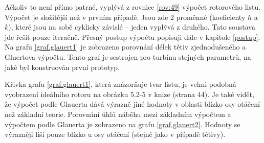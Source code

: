		Ačkoliv to není přímo patrné, vyplývá z rovnice \eqref{rov:49} výpočet rotorového listu. Výpočet je složitější než v prvním případě. Jsou zde 2 proměnné (koeficienty $h$ a $k$), které jsou na sobě cyklicky závislé – jeden vyplývá z druhého. Tato soustava jde řešit pouze iteračně. Přesný postup výpočtu popisuji dále v kapitole \ref{postup}. Na grafu \ref{graf.glauert1} je zobrazeno porovnání délek tětiv zjednodušeného a Gluertova výpočtu. Tento graf je sestrojen pro turbínu stejných parametrů, na jaké byl konstruován první prototyp.
		
		Křivka grafu \ref{graf.glauert1}, která znázorňuje tvar listu, je velmi podobná vyobrazení ideálního rotoru na obrázku 5.2-5 v knize \cite{Crome:Technika} (strana 44). Je také vidět, že výpočet podle Glauerta dává výrazně jiné hodnoty v oblasti blízko osy otáčení než základní teorie.
		Porovnání úhlů náběhu mezi základním výpočtem a výpočtem podle Glauerta je zobrazeno na grafu \ref{graf.glauert2}. Hodnoty se výrazněji liší pouze blízko u osy otáčení (stejně jako v případě tětivy).
		
